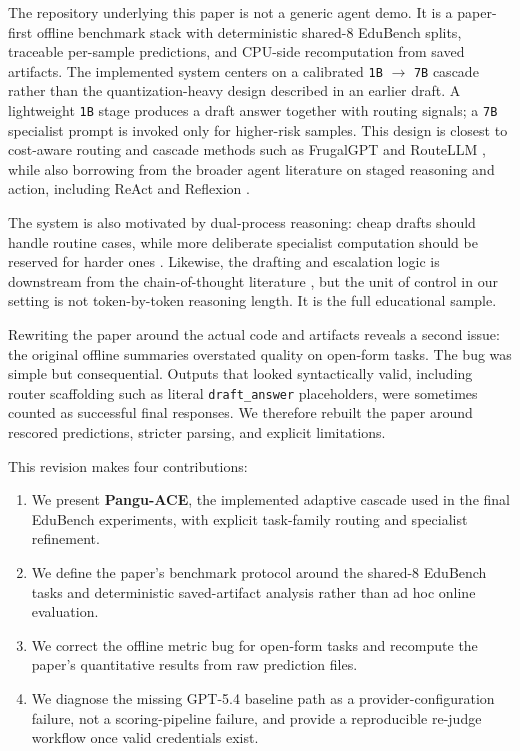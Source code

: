 \documentclass{article}
\begin{document}
The repository underlying this paper is not a generic agent demo. It is a paper-first offline benchmark stack with deterministic shared-8 EduBench splits, traceable per-sample predictions, and CPU-side recomputation from saved artifacts. The implemented system centers on a calibrated \texttt{1B} $\rightarrow$ \texttt{7B} cascade rather than the quantization-heavy design described in an earlier draft. A lightweight \texttt{1B} stage produces a draft answer together with routing signals; a \texttt{7B} specialist prompt is invoked only for higher-risk samples. This design is closest to cost-aware routing and cascade methods such as FrugalGPT and RouteLLM \cite{frugalgpt, routellm}, while also borrowing from the broader agent literature on staged reasoning and action, including ReAct and Reflexion \cite{react, reflexion}.

The system is also motivated by dual-process reasoning: cheap drafts should handle routine cases, while more deliberate specialist computation should be reserved for harder ones \cite{kahneman2011thinking, system2attention, quiet_star}. Likewise, the drafting and escalation logic is downstream from the chain-of-thought literature \cite{wei2022chain, self_consistency}, but the unit of control in our setting is not token-by-token reasoning length. It is the full educational sample.

Rewriting the paper around the actual code and artifacts reveals a second issue: the original offline summaries overstated quality on open-form tasks. The bug was simple but consequential. Outputs that looked syntactically valid, including router scaffolding such as literal \texttt{draft\_answer} placeholders, were sometimes counted as successful final responses. We therefore rebuilt the paper around rescored predictions, stricter parsing, and explicit limitations.

This revision makes four contributions:
\begin{enumerate}
    \item We present \textbf{Pangu-ACE}, the implemented adaptive cascade used in the final EduBench experiments, with explicit task-family routing and specialist refinement.
    \item We define the paper's benchmark protocol around the shared-8 EduBench tasks and deterministic saved-artifact analysis rather than ad hoc online evaluation.
    \item We correct the offline metric bug for open-form tasks and recompute the paper's quantitative results from raw prediction files.
    \item We diagnose the missing GPT-5.4 baseline path as a provider-configuration failure, not a scoring-pipeline failure, and provide a reproducible re-judge workflow once valid credentials exist.
\end{enumerate}
\end{document}
